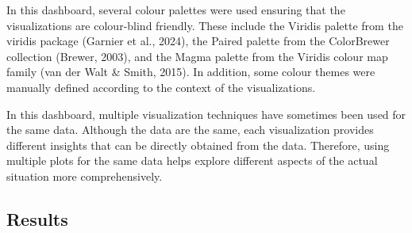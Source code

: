 \documentclass[
  letterpaper,
  DIV=11,
  numbers=noendperiod]{scrartcl}
\begin{document}
In this dashboard, several colour palettes were used ensuring that the
visualizations are colour-blind friendly. These include the Viridis
palette from the viridis package (Garnier et al., 2024), the Paired
palette from the ColorBrewer collection (Brewer, 2003), and the Magma
palette from the Viridis colour map family (van der Walt \& Smith,
2015). In addition, some colour themes were manually defined according
to the context of the visualizations.

In this dashboard, multiple visualization techniques have sometimes been
used for the same data. Although the data are the same, each
visualization provides different insights that can be directly obtained
from the data. Therefore, using multiple plots for the same data helps
explore different aspects of the actual situation more comprehensively.

\subsection{Results}\label{results}
\end{document}
